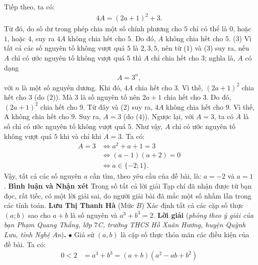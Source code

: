 \begin{multicols}{2}
	Tiếp theo, ta có:
	\begin{align*}
		4A  = (2a + 1)^2 + 3. \tag{$2$}
	\end{align*}
	Từ đó, do số dư trong phép chia một số chính phương cho $5$ chỉ có thể là $0$, hoặc $1$, hoặc $4$, suy ra $4A$ không chia hết cho $5$. Do đó, $A$ không chia hết cho $5$. \hfill ($3$)
	\vskip 0.05cm
	Vì tất cả các số nguyên tố không vượt quá $5$ là $2, 3, 5$, nên từ ($1$) và ($3$) suy ra, nếu $A$ chỉ có ước nguyên tố không vượt quá $5$ thì $A$ chỉ chia hết cho $3$; nghĩa là, $A$ có dạng
	\begin{align*}
		 A = 3^n, \tag{$4$}
	\end{align*}
	với $n$ là một số nguyên dương.
	\vskip 0.05cm
	Khi đó, $4A$ chia hết cho $3$. Vì thế, $(2a + 1)^2$ chia hết cho $3$ (do ($2$)). Mà $3$ là số nguyên tố nên $2a + 1$ chia hết cho $3$. Do đó, $(2a+1)^2$ chia hết cho $9$. Từ đây và ($2$) suy ra, $4A$ không chia hết cho $9$. Vì thế, A không chia hết cho $9$. Suy ra, $A = 3$ (do ($4$)).
	\vskip 0.05cm
	Ngược lại, với $A = 3$, ta có $A$ là số chỉ có ước nguyên tố không vượt quá $5$.
	\vskip 0.05cm
	Như vậy, $A$ chỉ có ước nguyên tố không vượt quá $5$ khi và chỉ khi $A = 3$.
	Ta có:
	\begin{align*}
		A = 3 &\Leftrightarrow a^2 + a + 1 = 3 \\
		&\Leftrightarrow (a-1)(a+2) = 0\\
		&\Leftrightarrow a \in \{-2;1\}.
	\end{align*}
	Vậy, tất cả các số nguyên $a$ cần tìm, theo yêu cầu của đề bài, là: $a = -2$ và $a = 1$.
	\vskip 0.05cm
	\textbf{\color{thachthuctoanhoc}Bình luận và Nhận xét}
	\vskip 0.05cm
	Trong số tất cả lời giải Tạp chí đã nhận được từ bạn đọc, rất tiếc, có một lời giải sai, do người giải bài đã mắc một số nhầm lẫn trong các tính toán.
	\vskip 0.1cm
	\hfill	\textbf{\color{thachthuctoanhoc}Lưu Thị Thanh Hà}
	\vskip 0.1cm
	{}
	(Mức $B$) Xác định tất cả các cặp số thực $(a;b)$ sao cho $a+b$ là số nguyên và $a^3+b^3=2$. 
	\vskip 0.05cm
	\textbf{\color{thachthuctoanhoc}Lời giải} (\textit{phỏng theo ý giải của bạn Phạm Quang Thắng, lớp $7$C, trường THCS Hồ Xuân Hương, huyện Quỳnh Lưu, tỉnh Nghệ An})\textbf{\color{thachthuctoanhoc}.}
	\vskip 0.05cm
	$\bullet$ Giả sử $(a, b)$ là cặp số thực thỏa mãn các điều kiện của đề bài.
	\vskip 0.05cm
	Ta có:
	\begin{align*}
		0 < 2 &= {a^3} + {b^3} = \left( {a + b} \right)\left( {{a^2} - ab + {b^2}} \right) \\[-0.5ex]

\end{align*}
\end{multicols}
